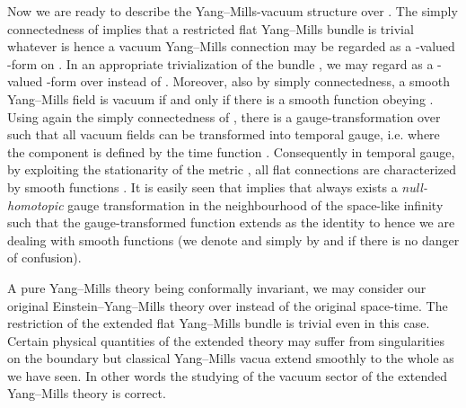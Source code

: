 \documentclass[a4paper,12pt,draft]{article}
\providecommand{\g}{{\mathfrak g}}
\providecommand{\dd}{{\rm d}}
\begin{document}
Now we are ready to describe the Yang--Mills-vacuum structure over \coordHE{}. The simply connectedness of \coordHE{} implies that a restricted
flat Yang--Mills bundle \coordHE{} is trivial whatever \coordHE{} is hence a
vacuum Yang--Mills connection \coordHE{} may be regarded as a \myHighlight{$\g$}\coordHE{}-valued
\coordHE{}-form on \coordHE{}. In an appropriate trivialization of the bundle
\coordHE{}, we may regard \coordHE{} as a \myHighlight{$\g$}\coordHE{}-valued \coordHE{}-form over \coordHE{}
instead of \coordHE{}. Moreover, also by simply connectedness, a smooth
Yang--Mills field \coordHE{} is vacuum if and only if there is a
smooth function \coordHE{} obeying \myHighlight{$A\vert_N=f^{-1}\dd f$}\coordHE{}. Using
again the simply connectedness of \coordHE{}, there is a gauge-transformation
over \coordHE{} such that all vacuum fields can be transformed into temporal
gauge, i.e. \coordHE{} where the \coordHE{} component is defined by the
time function \coordHE{}. Consequently in temporal gauge, by exploiting the
stationarity of the metric \coordHE{}, all flat connections are characterized by
smooth functions \coordHE{}. It is easily seen that
\coordHE{} implies that always
exists a {\it null-homotopic} gauge transformation in the neighbourhood of
the space-like infinity \coordHE{} such that the
gauge-transformed function \coordHE{} extends as the identity to
\coordHE{} hence we are dealing with smooth functions
\coordHE{} (we denote \coordHE{} and
\coordHE{} simply by \coordHE{} and \coordHE{} if there is no
danger of confusion).

A pure Yang--Mills theory being conformally invariant, we may consider
our original Ein\-stein--Yang--Mills theory over \coordHE{} instead of the original space-time. The
restriction of the extended flat Yang--Mills bundle \coordHE{} is trivial even in this case. Certain physical
quantities of the extended theory may suffer from singularities on the
boundary \coordHE{} but classical Yang--Mills vacua extend smoothly
to the whole \coordHE{} as we have seen. In other
words the studying of the vacuum sector of the extended Yang--Mills theory
is correct.
\end{document}
